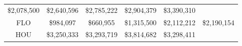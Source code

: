 \documentclass[]{book}
\theoremstyle{definition}
\theoremstyle{definition}
\theoremstyle{definition}
\theoremstyle{remark}
\begin{document}
\begin{longtable}[]{@{}cccccc@{}}
\begin{minipage}[t]{0.15\columnwidth}
\$2,078,500\strut
\end{minipage} & \begin{minipage}[t]{0.15\columnwidth}\centering
\$2,640,596\strut
\end{minipage} & \begin{minipage}[t]{0.15\columnwidth}\centering
\$2,785,222\strut
\end{minipage} & \begin{minipage}[t]{0.15\columnwidth}\centering
\$2,904,379\strut
\end{minipage} & \begin{minipage}[t]{0.15\columnwidth}\centering
\$3,390,310\strut
\end{minipage}\tabularnewline
\begin{minipage}[t]{0.09\columnwidth}\centering
FLO\strut
\end{minipage} & \begin{minipage}[t]{0.15\columnwidth}\centering
\$984,097\strut
\end{minipage} & \begin{minipage}[t]{0.15\columnwidth}\centering
\$660,955\strut
\end{minipage} & \begin{minipage}[t]{0.15\columnwidth}\centering
\$1,315,500\strut
\end{minipage} & \begin{minipage}[t]{0.15\columnwidth}\centering
\$2,112,212\strut
\end{minipage} & \begin{minipage}[t]{0.15\columnwidth}\centering
\$2,190,154\strut
\end{minipage}\tabularnewline
\begin{minipage}[t]{0.09\columnwidth}\centering
HOU\strut
\end{minipage} & \begin{minipage}[t]{0.15\columnwidth}\centering
\$3,250,333\strut
\end{minipage} & \begin{minipage}[t]{0.15\columnwidth}\centering
\$3,293,719\strut
\end{minipage} & \begin{minipage}[t]{0.15\columnwidth}\centering
\$3,814,682\strut
\end{minipage} & \begin{minipage}[t]{0.15\columnwidth}\centering
\$3,298,411\strut
\end{minipage} & \begin{minipage}[t]{0.15\columnwidth}\centering

\end{minipage}
\end{longtable}
\end{document}
